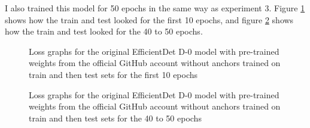 I also trained this model for 50 epochs in the same way as experiment 3. Figure \ref{fig:fig12} shows how the train and test looked for the first 10 epochs, and figure \ref{fig:fig14} shows how the train and test looked for the 40 to 50 epochs.

\begin{figure}[!ht]
    \label{fig:fig12}
    \caption{Loss graphs for the original EfficientDet D-0 model with pre-trained weights from the official GitHub account without anchors trained on train and then test sets for the first 10 epochs}
\end{figure}

\begin{figure}[H]
    \label{fig:fig14}
    \caption{Loss graphs for the original EfficientDet D-0 model with pre-trained weights from the official GitHub account without anchors trained on train and then test sets for the 40 to 50 epochs}
\end{figure}

